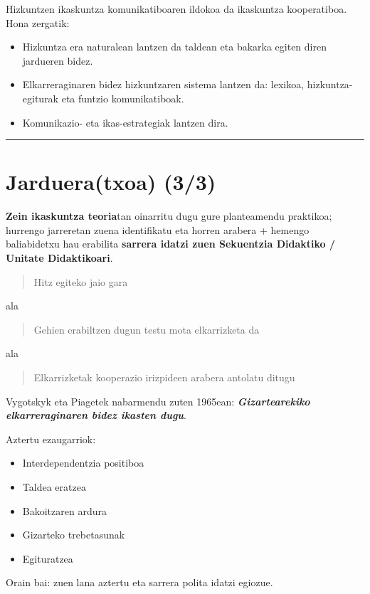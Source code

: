 \documentclass[]{book}
\providecommand{\tightlist}{%
  \setlength{\itemsep}{0pt}\setlength{\parskip}{0pt}}
\begin{document}
Hizkuntzen ikaskuntza komunikatiboaren ildokoa da ikaskuntza kooperatiboa. Hona zergatik:

\begin{itemize}
\tightlist
\item
  Hizkuntza era naturalean lantzen da taldean eta bakarka egiten diren jardueren bidez.
\item
  Elkarreraginaren bidez hizkuntzaren sistema lantzen da: lexikoa, hizkuntza-egiturak eta funtzio komunikatiboak.
\item
  Komunikazio- eta ikas-estrategiak lantzen dira.
\end{itemize}

\begin{center}\rule{0.5\linewidth}{\linethickness}\end{center}

\hypertarget{jardueratxoa-33}{%
\chapter*{Jarduera(txoa) (3/3)}\label{jardueratxoa-33}}

\textbf{Zein ikaskuntza teoria}tan oinarritu dugu gure planteamendu praktikoa; hurrengo jarreretan zuena identifikatu eta horren arabera + hemengo baliabidetxu hau erabilita \textbf{sarrera idatzi zuen Sekuentzia Didaktiko / Unitate Didaktikoari}.

\begin{quote}
Hitz egiteko jaio gara
\end{quote}

ala

\begin{quote}
Gehien erabiltzen dugun testu mota elkarrizketa da
\end{quote}

ala

\begin{quote}
Elkarrizketak kooperazio irizpideen arabera antolatu ditugu
\end{quote}

Vygotskyk eta Piagetek nabarmendu zuten 1965ean: \textbf{\emph{Gizartearekiko elkarreraginaren bidez ikasten dugu}}.

Aztertu ezaugarriok:

\begin{itemize}
\tightlist
\item
  Interdependentzia positiboa
\item
  Taldea eratzea
\item
  Bakoitzaren ardura
\item
  Gizarteko trebetasunak
\item
  Egituratzea
\end{itemize}

Orain bai: zuen lana aztertu eta sarrera polita idatzi egiozue.
\end{document}
